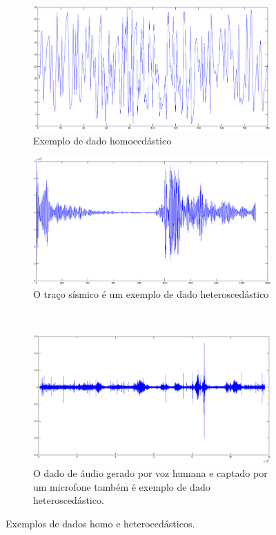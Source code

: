 \begin{figure}[!ht]
\centering
\begin{subfigure}{.49\textwidth}
  \centering
  \includegraphics[width=1\linewidth]{fig/homocedastico.png}  
  \caption{Exemplo de dado homocedástico}
  \label{Figura:exemplodedadohomocedastico}
\end{subfigure}%
\hfill
\begin{subfigure}{.49\textwidth}
  \centering
  \includegraphics[width=1\linewidth]{fig/tracosismico.png}
  \caption[Exemplo de dado heteroscedástico]{O traço sísmico é um exemplo de
  dado heteroscedástico}
  \label{Figura:exemplodedadoheterocedasticosismico}
\end{subfigure}\\[1ex]
\begin{subfigure}{.49\textwidth}
  \centering
  \includegraphics[width=1\linewidth]{fig/tracoaudio.png}
  \caption{O dado de áudio gerado por voz humana e captado por um microfone
  também é exemplo de dado heteroscedástico.}
  \label{Figura:exemplodedadoheterocedasticoaudio}
\end{subfigure}
  \caption{Exemplos de dados homo e heterocedásticos.}
\label{Figura:exemplosdadoshomoehetero}
\end{figure} 

